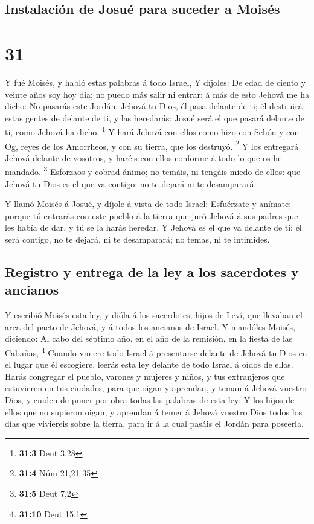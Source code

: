 \hypertarget{instalaciuxf3n-de-josuuxe9-para-suceder-a-moisuxe9s}{%
\subsection{Instalación de Josué para suceder a
Moisés}\label{instalaciuxf3n-de-josuuxe9-para-suceder-a-moisuxe9s}}

\hypertarget{section-30}{%
\section{31}\label{section-30}}

 Y fué Moisés, y habló estas palabras á todo Israel,
 Y díjoles: De edad de ciento y veinte años soy hoy día;
no puedo más salir ni entrar: á más de esto Jehová me ha dicho: No
pasarás este Jordán.  Jehová tu Dios, él pasa delante de
ti; él destruirá estas gentes de delante de ti, y las heredarás: Josué
será el que pasará delante de ti, como Jehová ha dicho. \footnote{\textbf{31:3}
  Deut 3,28}  Y hará Jehová con ellos como hizo con Sehón
y con Og, reyes de los Amorrheos, y con su tierra, que los destruyó.
\footnote{\textbf{31:4} Núm 21,21-35}  Y los entregará
Jehová delante de vosotros, y haréis con ellos conforme á todo lo que os
he mandado. \footnote{\textbf{31:5} Deut 7,2}  Esforzaos y
cobrad ánimo; no temáis, ni tengáis miedo de ellos: que Jehová tu Dios
es el que va contigo: no te dejará ni te desamparará.

 Y llamó Moisés á Josué, y díjole á vista de todo Israel:
Esfuérzate y anímate; porque tú entrarás con este pueblo á la tierra que
juró Jehová á sus padres que les había de dar, y tú se la harás heredar.
 Y Jehová es el que va delante de ti; él será contigo, no
te dejará, ni te desamparará; no temas, ni te intimides.

\hypertarget{registro-y-entrega-de-la-ley-a-los-sacerdotes-y-ancianos}{%
\subsection{Registro y entrega de la ley a los sacerdotes y
ancianos}\label{registro-y-entrega-de-la-ley-a-los-sacerdotes-y-ancianos}}

 Y escribió Moisés esta ley, y dióla á los sacerdotes,
hijos de Leví, que llevaban el arca del pacto de Jehová, y á todos los
ancianos de Israel.  Y mandóles Moisés, diciendo: Al cabo
del séptimo año, en el año de la remisión, en la fiesta de las Cabañas,
\footnote{\textbf{31:10} Deut 15,1}  Cuando viniere todo
Israel á presentarse delante de Jehová tu Dios en el lugar que él
escogiere, leerás esta ley delante de todo Israel á oídos de ellos.
 Harás congregar el pueblo, varones y mujeres y niños, y
tus extranjeros que estuvieren en tus ciudades, para que oigan y
aprendan, y teman á Jehová vuestro Dios, y cuiden de poner por obra
todas las palabras de esta ley:  Y los hijos de ellos que
no supieron oigan, y aprendan á temer á Jehová vuestro Dios todos los
días que viviereis sobre la tierra, para ir á la cual pasáis el Jordán
para poseerla.

